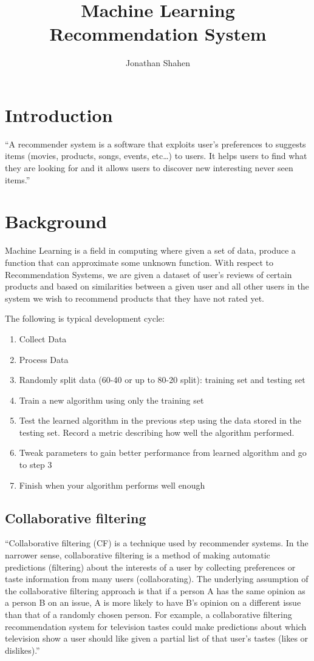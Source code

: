 \documentclass[10pt,a4paper]{article}
\title{Machine Learning Recommendation System}
\author{Jonathan Shahen}
\begin{document}
\maketitle

\section{Introduction}

``A recommender system is a software that exploits user’s preferences to suggests items (movies, products, songs, events, etc…) to users. It helps users to find what they are looking for and it allows users to discover new interesting never seen items.'' \cite{bellini-howto}

\section{Background}
Machine Learning is a field in computing where given a set of data, produce a function that can approximate some unknown function.
With respect to Recommendation Systems, we are given a dataset of user's reviews of certain products and based on similarities between a given user and all other users in the system we wish to recommend products that they have not rated yet.

The following is typical development cycle:
\begin{enumerate}
    \item Collect Data
    \item Process Data
    \item Randomly split data (60-40 or up to 80-20 split): training set and testing set
    \item Train a new algorithm using only the training set
    \item Test the learned algorithm in the previous step using the data stored in the testing set. Record a metric describing how well the algorithm performed.
    \item Tweak parameters to gain better performance from learned algorithm and go to step 3
    \item Finish when your algorithm performs well enough
\end{enumerate}


\subsection{Collaborative filtering}
``Collaborative filtering (CF) is a technique used by recommender systems.
In the narrower sense, collaborative filtering is a method of making automatic predictions (filtering) about the interests of a user by collecting preferences or taste information from many users (collaborating). The underlying assumption of the collaborative filtering approach is that if a person A has the same opinion as a person B on an issue, A is more likely to have B's opinion on a different issue than that of a randomly chosen person. For example, a collaborative filtering recommendation system for television tastes could make predictions about which television show a user should like given a partial list of that user's tastes (likes or dislikes).'' \cite{wiki:collaborative_filtering}
\end{document}
